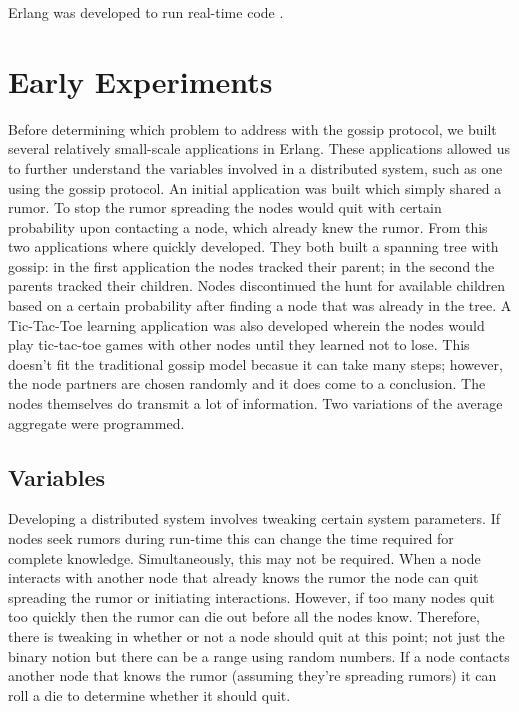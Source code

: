 \documentclass[11pt,twocolumn]{article}
\begin{document}
Erlang was developed to run real-time code \cite{Erlang}.

\section{Early Experiments}

Before determining which problem to address with the gossip protocol, we
 built several relatively small-scale applications in Erlang.  These applications
 allowed us to further understand the variables involved in a distributed system,
 such as one using the gossip protocol.  An initial application was built
 which simply shared a rumor.  To stop the rumor spreading the nodes would quit
 with certain probability upon contacting a node, which already knew
 the rumor.  From this two applications where quickly developed.  They both
 built a spanning tree with gossip: in the first application the nodes tracked
 their parent; in the second the parents tracked their children.  Nodes discontinued
 the hunt for available children based on a certain probability after
 finding a node that was already in the tree.  A Tic-Tac-Toe learning
 application was also developed wherein the nodes would play tic-tac-toe
 games with other nodes until they learned not to lose.  This doesn't fit the
 traditional gossip model becasue it can take many steps; however, the node
 partners are chosen randomly and it does come to a conclusion.  The nodes
 themselves do transmit a lot of information.  Two variations of the average
 aggregate were programmed.

\subsection{Variables}

Developing a distributed system involves tweaking certain system parameters.  If
 nodes seek rumors during run-time this can change the time required for
 complete knowledge.  Simultaneously, this may not be required.  When a
 node interacts with another node that already knows the rumor the node can quit
 spreading the rumor or initiating interactions.  However, if too many nodes
 quit too quickly then the rumor can die out before all the nodes know.  Therefore,
 there is tweaking in whether or not a node should quit at this point; not just
 the binary notion but there can be a range using random numbers.  If a node
 contacts another node that knows the rumor (assuming they're spreading
 rumors) it can roll a die to determine whether it should quit.  
\end{document}
